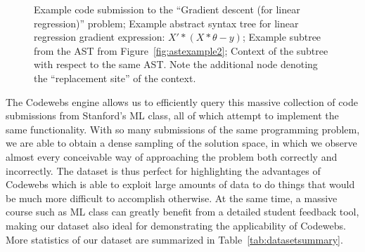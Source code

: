 \begin{figure}[ht]
\center
{}

\caption[Example subtree]{
 Example code submission to the ``Gradient descent (for linear regression)'' problem;
 Example abstract syntax tree for linear regression gradient expression: $X'*(X*\theta - y)$;
 Example subtree from the AST from Figure~\ref{fig:astexample2};  
Context of the subtree with respect to the same AST.  Note the additional node denoting the ``replacement site'' of the context.
}
\end{figure}

The Codewebs engine allows us to efficiently query this massive collection of code 
submissions from Stanford's ML class, all of which attempt to implement the same functionality.  With so many submissions of the same 
programming problem, we are able to obtain a dense sampling of the solution space, in which 
 we observe almost every conceivable way of approaching the problem both correctly and incorrectly.
The dataset is thus perfect for highlighting the advantages of Codewebs which is able to exploit large amounts of data to do things 
that would be much more difficult to accomplish otherwise.
At the same time, a massive course such as ML class can greatly benefit from a detailed student feedback tool, 
making our dataset also ideal for demonstrating the applicability of Codewebs.
More statistics of our dataset are summarized in Table~\ref{tab:datasetsummary}.

